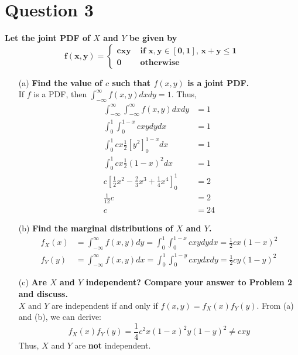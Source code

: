 \documentclass{article}
\newcommand{\intinf}{\int_{-\infty}^{\infty}}
\begin{document}
\section*{Question 3}
\textbf{Let the joint PDF of $X$ and $Y$ be given by}
\[
	\mathbf{f(x,y) = \begin{cases} cxy &\text{ if } x,y\in[0,1]\text{, }x+y\leq 1 \\ 0 &\text{ otherwise} \end{cases}}
\]
\begin{itemize}
	\item[(a)] \textbf{Find the value of $c$ such that $f(x,y)$ is a joint PDF.}
	\bigskip \\
	If $f$ is a PDF, then $\intinf f(x,y)dxdy=1$. Thus,
	\begin{align*}
		\intinf\intinf f(x,y)dxdy 											&= 1	\\
		\int_0^1 \int_0^{1-x} cxy dydx										&= 1	\\
		\int_0^1 cx\frac{1}{2}[y^2]^{1-x}_0 dx								&= 1	\\
		\int_0^1 cx\frac{1}{2}(1-x)^2 dx									&= 1	\\
		c\left[\frac{1}{2}x^2 - \frac{2}{3}x^3 +\frac{1}{4}x^4\right]^1_0	&= 2	\\
		\frac{1}{12}c														&= 2	\\
		c																	&= 24
	\end{align*}

	\item[(b)] \textbf{Find the marginal distributions of $X$ and $Y$.}
	\begin{align*}
		f_X(x) &= \intinf f(x,y)dy = \int_0^1 \int_0^{1-x} cxy dydx = \frac{1}{2}cx(1-x)^2	\\
		f_Y(y) &= \intinf f(x,y)dx = \int_0^1 \int_0^{1-y} cxy dxdy = \frac{1}{2}cy(1-y)^2
	\end{align*}
	

	\item[(c)] \textbf{Are $X$ and $Y$ independent? Compare your answer to Problem 2 and discuss.}
	\bigskip \\
	$X$ and $Y$ are independent if and only if $f(x,y)=f_X(x)f_Y(y)$. From (a) and (b), we can derive:
	\[
		f_X(x)f_Y(y) = \frac{1}{4}c^2x(1-x)^2y(1-y)^2 \neq cxy
	\]
	Thus, $X$ and $Y$ are \textbf{not} independent.
	
	
\end{itemize}


\end{document}
